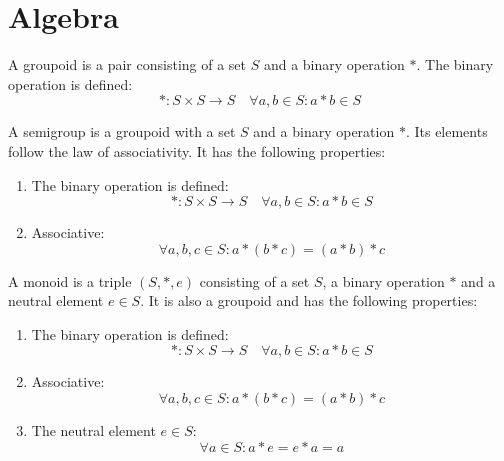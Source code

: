 \chapter{Algebra}

\begin{definition}[Groupoid]
    A groupoid is a pair consisting of a set $S$ and a binary operation $*$.
    The binary operation is defined:
    \begin{equation}
        *: S \times S \rightarrow S \quad \forall a,b \in S: a * b \in S
    \end{equation}
\end{definition}

\begin{definition}[Semigroup]
    A semigroup is a groupoid with a set $S$ and a binary operation $*$.
    Its elements follow the law of associativity.
    It has the following properties:
    \begin{enumerate}
        \item The binary operation is defined:
            \begin{equation}
                *: S \times S \rightarrow S \quad \forall a,b \in S: a * b \in S
            \end{equation}
        \item Associative:
            \begin{equation}
                \forall a,b,c \in S: a * (b * c) = (a * b) * c
            \end{equation} 
    \end{enumerate}
\end{definition}

\begin{definition}[Monoid]
    A monoid is a triple $(S, *, e)$ consisting of a set $S$, a binary operation $*$ and 
    a neutral element $e \in S$.
    It is also a groupoid and has the following properties:
    \begin{enumerate}
        \item The binary operation is defined:
            \begin{equation}
                *: S \times S \rightarrow S \quad \forall a,b \in S: a * b \in S
            \end{equation}
        \item Associative:
            \begin{equation}
                \forall a,b,c \in S: a * (b * c) = (a * b) * c
            \end{equation} 
        \item The neutral element $e \in S$:
            \begin{equation}
                \forall a \in S: a * e = e * a = a
            \end{equation}
    \end{enumerate}
\end{definition}

